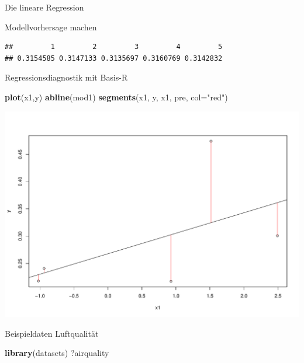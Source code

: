 \documentclass[ignorenonframetext,]{beamer}
\newenvironment{Shaded}{}{}
\newcommand{\KeywordTok}[1]{\textcolor[rgb]{0.00,0.44,0.13}{\textbf{{#1}}}}
\newcommand{\DataTypeTok}[1]{\textcolor[rgb]{0.56,0.13,0.00}{{#1}}}
\newcommand{\StringTok}[1]{\textcolor[rgb]{0.25,0.44,0.63}{{#1}}}
\newcommand{\NormalTok}[1]{{#1}}
\begin{document}
\begin{frame}[fragile]{Die lineare Regression}
\begin{block}{Modellvorhersage machen}
\begin{verbatim}
##         1         2         3         4         5 
## 0.3154585 0.3147133 0.3135697 0.3160769 0.3142832
\end{verbatim}

\end{block}

\begin{block}{Regressionsdiagnostik mit Basis-R}

\begin{Shaded}
\begin{Highlighting}[]
\KeywordTok{plot}\NormalTok{(x1,y)}
\KeywordTok{abline}\NormalTok{(mod1)}
\KeywordTok{segments}\NormalTok{(x1, y, x1, pre, }\DataTypeTok{col=}\StringTok{"red"}\NormalTok{)}
\end{Highlighting}
\end{Shaded}

\includegraphics{R_intern_files/figure-beamer/unnamed-chunk-300-1.pdf}

\end{block}

\begin{block}{Beispieldaten Luftqualität}

\begin{Shaded}
\begin{Highlighting}[]
\KeywordTok{library}\NormalTok{(datasets)}
\NormalTok{?airquality}
\end{Highlighting}
\end{Shaded}


\end{block}
\end{frame}
\end{document}
